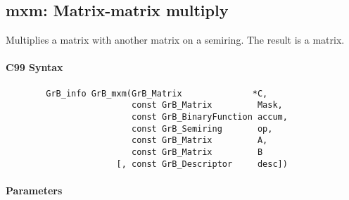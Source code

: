 \subsection{{\sf mxm}: Matrix-matrix multiply}

Multiplies a matrix with another matrix on a semiring. The result is a matrix.

\paragraph{C99 Syntax}

\begin{verbatim}
        GrB_info GrB_mxm(GrB_Matrix              *C,
                         const GrB_Matrix         Mask,
                         const GrB_BinaryFunction accum,
                         const GrB_Semiring       op,
                         const GrB_Matrix         A, 
                         const GrB_Matrix         B
                      [, const GrB_Descriptor     desc])
\end{verbatim}

\paragraph{Parameters}

